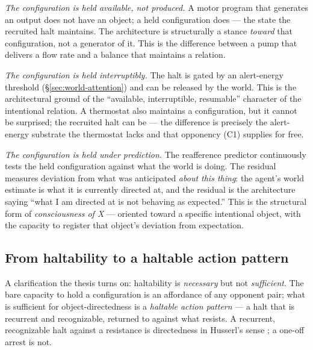 \documentclass{article}
\begin{document}
\emph{The configuration is held available, not produced.}  A motor
program that generates an output does not have an object; a held
configuration does --- the state the recruited halt maintains.  The
architecture is structurally a stance \emph{toward} that configuration,
not a generator of it.  This is the difference between a pump that
delivers a flow rate and a balance that maintains a relation.

\emph{The configuration is held interruptibly.}  The halt is gated by an
alert-energy threshold (\S\ref{sec:world-attention}) and can be released
by the world.  This is the architectural ground of the ``available,
interruptible, resumable'' character of the intentional relation.  A
thermostat also maintains a configuration, but it cannot be surprised;
the recruited halt can be --- the difference is precisely the
alert-energy substrate the thermostat lacks and that opponency (C1)
supplies for free.

\emph{The configuration is held under prediction.}  The reafference
predictor continuously tests the held configuration against what the
world is doing.  The residual measures deviation from what was
anticipated \emph{about this thing}: the agent's world estimate is what
it is currently directed at, and the residual is the architecture saying
``what I am directed at is not behaving as expected.''  This is the
structural form of \emph{consciousness of X} --- oriented toward a
specific intentional object, with the capacity to register that object's
deviation from expectation.

\subsection{From haltability to a haltable action
pattern}\label{sec:direct-pattern}

A clarification the thesis turns on: haltability is \emph{necessary} but
not \emph{sufficient}.  The bare capacity to hold a configuration is an
affordance of any opponent pair; what is sufficient for
object-directedness is a \emph{haltable action pattern} --- a halt that
is recurrent and recognizable, returned to against what resists.  A
recurrent, recognizable halt against a resistance is directedness in
Husserl's sense \citep{Husserl1900_LU,Husserl1913_Ideas}; a one-off
arrest is not.
\end{document}
